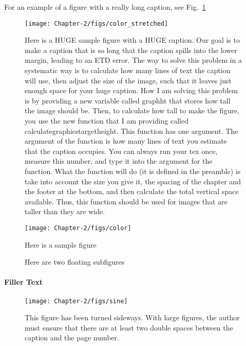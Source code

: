 For an example of a figure with a really long caption, see Fig.~\ref{fig:longcap}
\begin{figure}[hbtp]
\centering
{}
\texttt{[image: Chapter-2/figs/color\_stretched]}
\caption{Here is a HUGE sample figure with a HUGE caption. Our goal is to make a caption that is so long that the caption spills into the lower margin, leading to an ETD error. The way to solve this problem in a systematic way is to calculate how many lines of text the caption will use, then adjust the size of the image, such that it leaves just enough space for your huge caption. How I am solving this problem is by providing a new variable called graphht that stores how tall the image should be. Then, to calculate how tall to make the figure, you use the new function that I am providing called calculategraphicstargetheight. This function has one argument. The argument of the function is how many lines of text you estimate that the caption occupies. You can always run your tex once, measure this number, and type it into the argument for the function. What the function will do (it is defined in the preamble) is take into account the size you give it, the spacing of the chapter and the footer at the bottom, 
and then calculate the total vertical space available. Thus, this function should be used for images that are taller than they are wide.}
\label{fig:longcap}
\end{figure}
%
\begin{figure}[hbtp]
\centering
\texttt{[image: Chapter-2/figs/color]}
\caption{Here is a sample figure}
\label{fig:hist2}
\end{figure}
%
\begin{figure}[hbtp]
\centering
{}
\caption{Here are two floating subfigures}
\label{fig:subfigures}
\end{figure}


\paragraph{Filler Text} \lipsum[12-15]

\thispagestyle{lscapedplain}
\begin{landscape}
\begin{figure}
\centering
\texttt{[image: Chapter-2/figs/sine]}
\caption{This figure has been turned sideways.  With large figures, 
         the author must ensure that there are at least two double spaces
         between the caption and the page number.}
\label{fig:hist}
\end{figure}
\end{landscape}
\restoregeometry
\pagestyle{plain}
\thispagestyle{plain}


